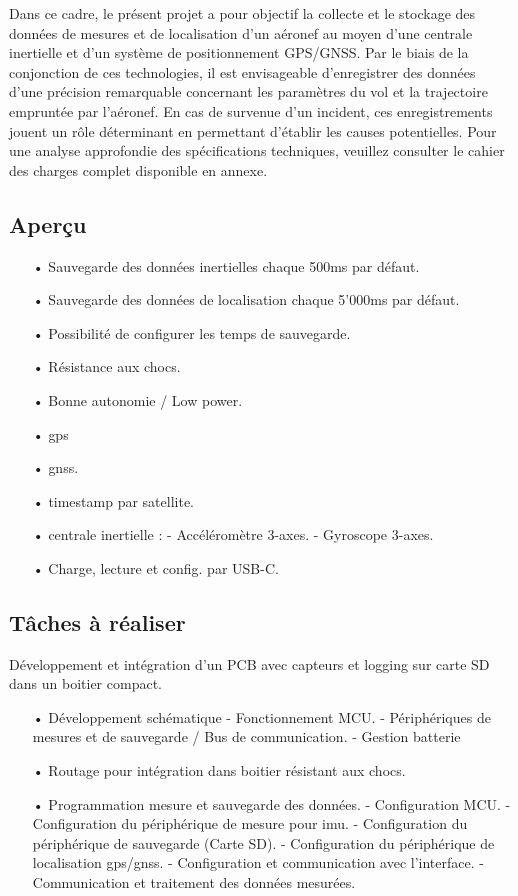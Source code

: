 Dans ce cadre, le présent projet a pour objectif la collecte et le stockage des données de mesures et de localisation d'un aéronef au moyen d'une centrale inertielle et d'un système de positionnement GPS/GNSS. Par le biais de la conjonction de ces technologies, il est envisageable d'enregistrer des données d'une précision remarquable concernant les paramètres du vol et la trajectoire empruntée par l'aéronef. En cas de survenue d'un incident, ces enregistrements jouent un rôle déterminant en permettant d'établir les causes potentielles. Pour une analyse approfondie des spécifications techniques, veuillez consulter le cahier des charges complet disponible en annexe.

\subsection{Aperçu}
\begin{itemize}
	\item[•]	Sauvegarde des données inertielles chaque 500ms par défaut.
	\item[•]	Sauvegarde des données de localisation chaque 5'000ms par défaut.
	\item[•]	Possibilité de configurer les temps de sauvegarde.
	\item[•]	Résistance aux chocs.
	\item[•]	Bonne autonomie / Low power.
	\item[•]	\Gls{gps}
	\item[•]	\Gls{gnss}.
	\item[•]	\Gls{timestamp} par satellite.
	\item[•]	\gls{centrale inertielle} :
	\subitem- 	Accéléromètre 3-axes. 
	\subitem-	Gyroscope 3-axes.
	\item[•] Charge, lecture et config. par USB-C.
\end{itemize}

\subsection{Tâches à réaliser}
Développement et intégration d’un PCB avec capteurs et logging sur carte SD dans un boitier compact.
\begin{itemize}
	\item[•] Développement schématique 
	\subitem- Fonctionnement MCU.
	\subitem-	Périphériques de mesures et de sauvegarde / Bus de communication.
	\subitem-	Gestion batterie 
	\item[•]	Routage pour intégration dans boitier résistant aux chocs.
	\item[•]	Programmation mesure et sauvegarde des données.
	\subitem-	Configuration MCU.
	\subitem-	Configuration du périphérique de mesure pour \gls{imu}.
	\subitem-	Configuration du périphérique de sauvegarde (Carte SD).
	\subitem-	Configuration du périphérique de localisation \gls{gps}/\gls{gnss}.
	\subitem-	Configuration et communication avec l'interface.
	\subitem-	Communication et traitement des données mesurées.
\end{itemize}

